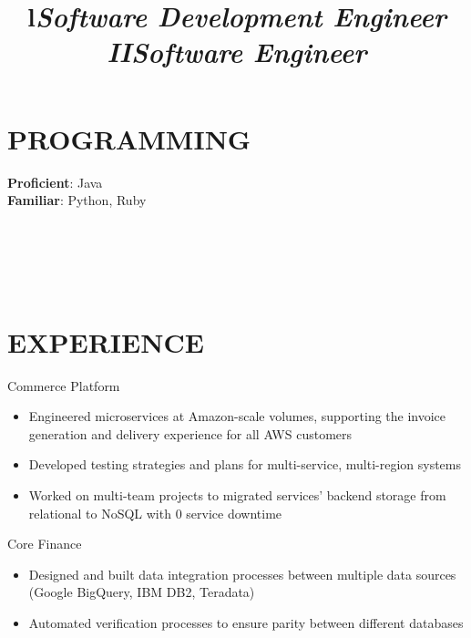 \documentclass[margin,11pt]{res}
\begin{document}
\begin{resume}
\section{PROGRAMMING}

\textbf{Proficient}: Java\\
\textbf{Familiar}: Python, Ruby\\

\begin{format}
\\
\title{l}\\
\body\\
\end{format}

\section{EXPERIENCE}
\title{\sl{Software Development Engineer II}}
\begin{position}
Commerce Platform\\
\begin{itemize}
\item Engineered microservices at Amazon-scale volumes, supporting the invoice generation and delivery experience for all AWS customers
\item Developed testing strategies and plans for multi-service, multi-region systems
\item Worked on multi-team projects to migrated services' backend storage from relational to NoSQL with 0 service downtime
\end{itemize}
\end{position}

\vspace{\baselineskip}

\title{\sl{Software Engineer}}
\begin{position}
Core Finance\\
\begin{itemize}
\item Designed and built data integration processes between multiple data sources (Google BigQuery, IBM DB2, Teradata)
\item Automated verification processes to ensure parity between different databases
\end{itemize}
\end{position}


\end{resume}
\end{document}
